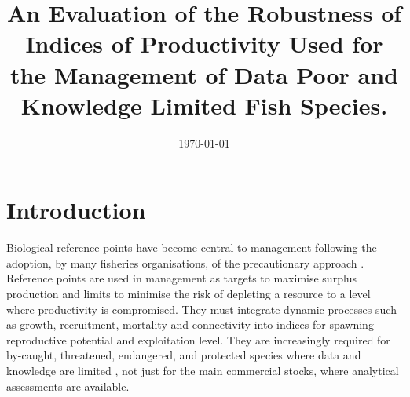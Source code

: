 \documentclass[12pt,doublespacing,a4paper]{ouparticle}
\begin{document}
\title{%
       An Evaluation of the Robustness of Indices of Productivity Used for the Management of Data Poor and Knowledge Limited Fish Species.}

\author{%
\address{ICCAT Secretariat, C/Coraz\'{o}n de Mar\'{\i}a, 8. 28002 Madrid, Spain}
\and
{}
\address{Universidade Federal Rural de Pernambuco (UFRPE), Departamento de Pesca e Aquicultura. Av. Dom Manuel s/n, Recife, Pernambuco, Brazil, 52171-900}
\email{}
}

\abstract{
}

\date{\today}

 
\maketitle

\newpage


\linenumbers
\linespread{2}


\section{Introduction}


Biological reference points have become central to management following the adoption, by many fisheries organisations, of the precautionary approach \citep[PA,][]{garcia1996precautionary}. Reference points are used in management as targets to maximise surplus production and  limits to minimise the risk of depleting a resource to a level where productivity is compromised. They must integrate dynamic processes such as growth, recruitment, mortality and connectivity into indices for spawning reproductive potential \citep{kell2015spawning} and exploitation level. They are increasingly required for by-caught, threatened, endangered, and protected species where data and knowledge are limited \citep{sainsbury2003ref}, not just for the main commercial stocks, where analytical assessments are available.
\end{document}
